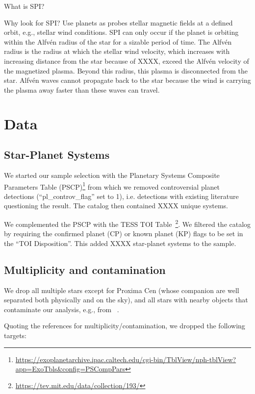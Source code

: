 \documentclass[twocolumn]{aastex631}
\begin{document}
What is SPI?

Why look for SPI? Use planets as probes stellar magnetic fields at a defined orbit, e.g., stellar wind conditions. SPI can only occur if the planet is orbiting within the Alfv\'en radius of the star for a sizable period of time. The Alfv\'en radius is the radius at which the stellar wind velocity, which increases with increasing distance from the star because of XXXX, exceed the Alfv\'en velocity of the magnetized plasma. Beyond this radius, this plasma is disconnected from the star. Alfv\'en waves cannot propagate back to the star because the wind is carrying the plasma away faster than these waves can travel.





\section{Data}
\label{sec:data}
\subsection{Star-Planet Systems}
We started our sample selection with the Planetary Systems Composite Parameters Table (PSCP)\footnote{ \url{https://exoplanetarchive.ipac.caltech.edu/cgi-bin/TblView/nph-tblView?app=ExoTbls&config=PSCompPars}} from which we removed controversial planet detections (``pl\_controv\_flag'' set to 1), i.e. detections with existing literature questioning the result. The catalog then contained XXXX unique systems.

We complemented the PSCP with the TESS TOI Table~\citep[TT][]{guerrero2021arxiv}\footnote{\url{https://tev.mit.edu/data/collection/193/}}. We filtered the catalog by requiring the confirmed planet (CP) or known planet (KP) flags to be set in the ``TOI Disposition''. This added XXXX star-planet systems to the sample.
\subsection{Multiplicity and contamination}
We drop all multiple stars except for Proxima Cen (whose companion are well separated both physically and on the sky), and all stars with nearby objects that contaminate our analysis, e.g., from ~\citet{ziegler2018measuring}.

Quoting the references for multiplicity/contamination, we dropped the following targets: 
\end{document}
